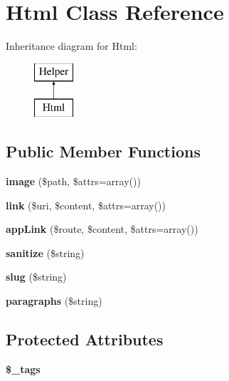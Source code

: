 \hypertarget{classHtml}{
\section{Html Class Reference}
\label{classHtml}
}
Inheritance diagram for Html:\begin{figure}[H]
\begin{center}
\leavevmode
\includegraphics[height=2.000000cm]{classHtml}
\end{center}
\end{figure}
\subsection*{Public Member Functions}
\begin{DoxyCompactItemize}
\item 
\hypertarget{classHtml_ad501c8f543ea6378ea2d2bac46574844}{
{\bfseries image} (\$path, \$attrs=array())}
\label{classHtml_ad501c8f543ea6378ea2d2bac46574844}

\item 
\hypertarget{classHtml_a045fc72e96c8dbbb67cee4c5fecf317c}{
{\bfseries link} (\$uri, \$content, \$attrs=array())}
\label{classHtml_a045fc72e96c8dbbb67cee4c5fecf317c}

\item 
\hypertarget{classHtml_a5861d9dea8c77d50d35aa9ca0193f733}{
{\bfseries appLink} (\$route, \$content, \$attrs=array())}
\label{classHtml_a5861d9dea8c77d50d35aa9ca0193f733}

\item 
\hypertarget{classHtml_aeac0bac8fb00b00b933fe988f83cdb2e}{
{\bfseries sanitize} (\$string)}
\label{classHtml_aeac0bac8fb00b00b933fe988f83cdb2e}

\item 
\hypertarget{classHtml_acfbddc05d7d04905b0850a2e40e56ec2}{
{\bfseries slug} (\$string)}
\label{classHtml_acfbddc05d7d04905b0850a2e40e56ec2}

\item 
\hypertarget{classHtml_a18f421b5e12a71b28004d43e8102355f}{
{\bfseries paragraphs} (\$string)}
\label{classHtml_a18f421b5e12a71b28004d43e8102355f}

\end{DoxyCompactItemize}
\subsection*{Protected Attributes}
\begin{DoxyCompactItemize}
\item 
{\bfseries \$\_\-tags}
\end{DoxyCompactItemize}


